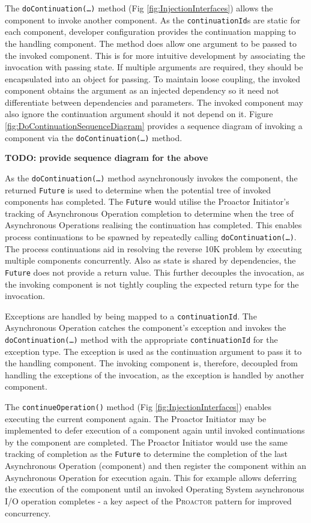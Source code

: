 \documentclass[prodmode]{style/acmlarge}
\begin{document}
The \texttt{doContinuation(\ldots)} method (Fig \ref{fig:InjectionInterfaces})
allows the component to invoke another component.  As the
\texttt{continuationId}s are static for each component, developer configuration
provides the continuation mapping to the handling component.  The method does
allow one argument to be passed to the invoked component.  This is for more
intuitive development by associating the invocation with passing state.  If
multiple arguments are required, they should be encapsulated into an object for
passing.  To maintain loose coupling, the invoked component obtains the argument
as an injected dependency so it need not differentiate between dependencies and
parameters.  The invoked component may also ignore the continuation argument
should it not depend on it.  Figure \ref{fig:DoContinuationSequenceDiagram}
provides a sequence diagram of invoking a component via the
\texttt{doContinuation(\ldots)} method.

\textbf{TODO: provide sequence diagram for the above}

As the \texttt{doContinuation(\ldots)} method asynchronously invokes the
component, the returned \texttt{Future} is used to determine when the potential
tree of invoked components has completed.  The \texttt{Future} would utilise the
Proactor Initiator's tracking of Asynchronous Operation completion to determine
when the tree of Asynchronous Operations realising the continuation has
completed.  This enables process continuations \cite{process-continuation} to be
spawned by repeatedly calling \texttt{doContinuation(\ldots)}.  The process
continuations aid in resolving the reverse 10K problem
\cite{reverse-ten-k-problem} by executing multiple components concurrently.
Also as state is shared by dependencies, the \texttt{Future} does not provide a
return value.  This further decouples the invocation, as the invoking component
is not tightly coupling the expected return type for the invocation.

Exceptions are handled by being mapped to a \texttt{continuationId}.  The
Asynchronous Operation catches the component's exception and invokes the
\texttt{doContinuation(\ldots)} method with the appropriate
\texttt{continuationId} for the exception type.  The exception is used as the
continuation argument to pass it to the handling component.  The invoking
component is, therefore, decoupled from handling the exceptions of the
invocation, as the exception is handled by another component.

The \texttt{continueOperation()} method (Fig \ref{fig:InjectionInterfaces})
enables executing the current component again.  The Proactor Initiator may be
implemented to defer execution of a component again until invoked continuations
by the component are completed.  The Proactor Initiator would use the same
tracking of completion as the \texttt{Future} to determine the completion of the
last Asynchronous Operation (component) and then register the component within
an Asynchronous Operation for execution again.  This for example allows
deferring the execution of the component until an invoked Operating System
asynchronous I/O operation completes - a key aspect of the \textsc{Proactor}
pattern for improved concurrency.
\end{document}
